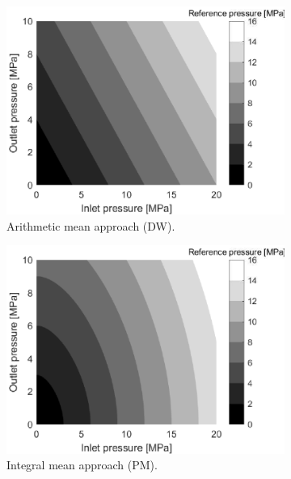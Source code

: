 \begin{figure}
    \centering
    \begin{subfigure}[b]{0.48\textwidth}
        \includegraphics[width=\textwidth]{img/Figure1a.eps}
        \caption{Arithmetic mean approach (DW).}
        \label{fig:refpresdw}
    \end{subfigure}
    \begin{subfigure}[b]{0.48\textwidth}
        \includegraphics[width=\textwidth]{img/Figure1b.eps}
        \caption{Integral mean approach (PM).}
        \label{fig:refprespm}
    \end{subfigure}
    \begin{subfigure}[b]{0.48\textwidth}

\end{subfigure}
\end{figure}
